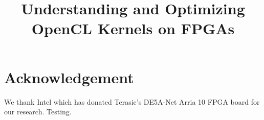 \documentclass[sigconf]{acmart}
\begin{document}
	
\title{Understanding and Optimizing OpenCL Kernels on FPGAs}




\maketitle









\section{Acknowledgement}
\vspace{-1ex}

We thank Intel which has donated Terasic\textquoteright s DE5A-Net Arria 10 FPGA board for our research. Testing.



\end{document}
